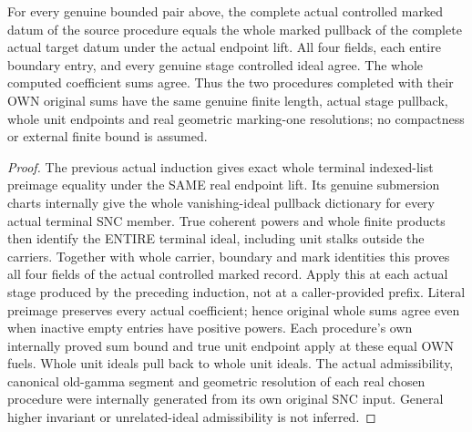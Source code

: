 \begin{theorem}
\label{hir:submersion-choice-whole-controlled-completion}
\leanok
For every genuine bounded pair above, the complete actual controlled
marked datum of the source procedure equals the whole marked pullback of
the complete actual target datum under the actual endpoint lift. All four
fields, each entire boundary entry, and every genuine stage controlled
ideal agree. The whole computed coefficient sums agree. Thus the two
procedures completed with their OWN original sums have the same genuine
finite length, actual stage pullback, whole unit endpoints and real
geometric marking-one resolutions; no compactness or external finite bound
is assumed.
\end{theorem}
\begin{proof}
The previous actual induction gives exact whole terminal indexed-list
preimage equality under the SAME real endpoint lift. Its genuine submersion
charts internally give the whole vanishing-ideal pullback dictionary for
every actual terminal SNC member. True coherent powers and whole finite
products then identify the ENTIRE terminal ideal, including unit stalks
outside the carriers. Together with whole carrier, boundary and mark
identities this proves all four fields of the actual controlled marked
record. Apply this at each actual stage produced by the preceding induction,
not at a caller-provided prefix. Literal preimage preserves every actual
coefficient; hence original whole sums agree even when inactive empty
entries have positive powers. Each procedure's own internally proved sum
bound and true unit endpoint apply at these equal OWN fuels. Whole unit
ideals pull back to whole unit ideals. The actual admissibility, canonical
old-gamma segment and geometric resolution of each real chosen procedure
were internally generated from its own original SNC input. General higher
invariant or unrelated-ideal admissibility is not inferred.
\end{proof}

